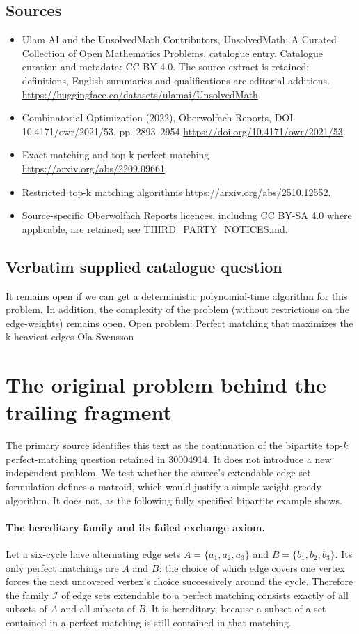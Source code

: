 \documentclass[11pt]{article}
\begin{document}
\subsection{Sources}
\begin{itemize}
\item[S1] Ulam AI and the UnsolvedMath Contributors, UnsolvedMath: A Curated Collection of Open Mathematics Problems, catalogue entry. Catalogue curation and metadata: CC BY 4.0. The source extract is retained; definitions, English summaries and qualifications are editorial additions.
\url{https://huggingface.co/datasets/ulamai/UnsolvedMath}.
\item[S2] Combinatorial Optimization (2022), Oberwolfach Reports, DOI 10.4171/owr/2021/53, pp. 2893--2954
\url{https://doi.org/10.4171/owr/2021/53}.
\item[S3] Exact matching and top-k perfect matching
\url{https://arxiv.org/abs/2209.09661}.
\item[S4] Restricted top-k matching algorithms
\url{https://arxiv.org/abs/2510.12552}.
\item Source-specific Oberwolfach Reports licences, including CC BY-SA 4.0 where applicable, are retained; see THIRD\_PARTY\_NOTICES.md.
\end{itemize}
\subsection{Verbatim supplied catalogue question}
It remains open if we can get a deterministic polynomial-time algorithm for this problem. In addition, the complexity of the problem (without restrictions on the edge-weights) remains open. Open problem: Perfect matching that maximizes the k-heaviest edges Ola Svensson

\section{The original problem behind the trailing fragment}
The primary source identifies this text as the continuation of
the bipartite top-$k$ perfect-matching question retained in
30004914. It does not introduce a new independent problem.
We test whether the source's extendable-edge-set formulation defines
a matroid, which would justify a simple weight-greedy algorithm.
It does not, as the following fully specified bipartite example shows.

\paragraph{The hereditary family and its failed exchange axiom.}
Let a six-cycle have alternating edge sets
$A=\{a_1,a_2,a_3\}$ and $B=\{b_1,b_2,b_3\}$.
Its only perfect matchings are $A$ and $B$: the choice of
which edge covers one vertex forces the next uncovered vertex's
choice successively around the cycle. Therefore the family
$\mathcal I$ of edge sets extendable to a perfect matching
consists exactly of all subsets of $A$ and all subsets of
$B$. It is hereditary, because a subset of a set contained
in a perfect matching is still contained in that matching.
\end{document}
